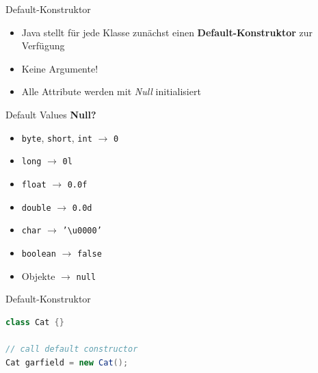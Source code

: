 \documentclass[18pt]{beamer}
\begin{document}
\begin{frame}{Default-Konstruktor}
    \begin{itemize}
        \item Java stellt für jede Klasse zunächst einen \textbf{Default-Konstruktor} zur Verfügung
        \item Keine Argumente!
        \item Alle Attribute werden mit \textit{Null} initialisiert
    \end{itemize}

\end{frame}

\begin{frame}[fragile]{Default Values}
    \textbf{Null?}
    \vspace{.2in}
    \begin{itemize}
        \item \texttt{byte}, \texttt{short}, \texttt{int} $\rightarrow$ \texttt{0}
        \item \texttt{long} $\rightarrow$ \texttt{0l}
        \item \texttt{float} $\rightarrow$ \texttt{0.0f}
        \item \texttt{double} $\rightarrow$ \texttt{0.0d}
        \item \texttt{char} $\rightarrow$ \texttt{'\textbackslash u0000'}
        \item \texttt{boolean} $\rightarrow$ \texttt{false}
        \item Objekte $\rightarrow$ \texttt{null}
    \end{itemize}

\end{frame}

\begin{frame}[fragile]{Default-Konstruktor}
    \begin{exampleblock}{}
        \begin{lstlisting}[language=Java]
class Cat {}

// call default constructor
Cat garfield = new Cat();
        \end{lstlisting}
    \end{exampleblock}
\end{frame}
\end{document}
